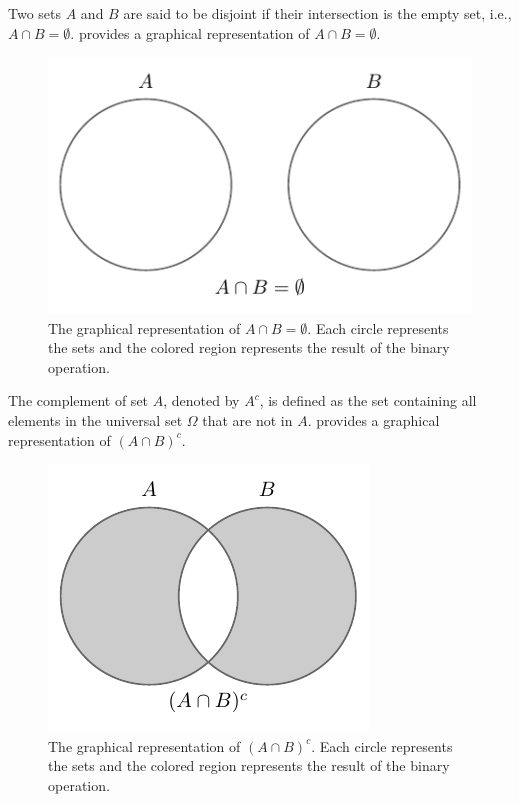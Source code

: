 \begin{definition}[Disjoint]
	Two sets $A$ and $B$ are said to be disjoint if their intersection is the empty set, i.e., $A \cap B = \emptyset$.  provides a graphical representation of $A \cap B=\emptyset$.
	\begin{figure}[H]
		\centering
		\includegraphics[]{figures/set_disjoint.pdf}
		\caption{The graphical representation of $A\cap B= \emptyset$. Each circle represents the sets and the colored region represents the result of the binary operation.}
		\label{fig:set_disjoint}
	\end{figure}
\end{definition}


\begin{definition}[Complementation]
	\label{def:complementation}
	The complement of set $A$, denoted by $A^c$, is defined as the set containing all elements in the universal set $\Omega$ that are not in $A$.  provides a graphical representation of $(A \cap B)^c$.
	\begin{figure}[H]
		\centering
		\includegraphics[]{figures/set_complementary.pdf}
		\caption{The graphical representation of $(A \cap B)^c$. Each circle represents the sets and the colored region represents the result of the binary operation.}
		\label{fig:set_complementation}
	\end{figure}
\end{definition}

